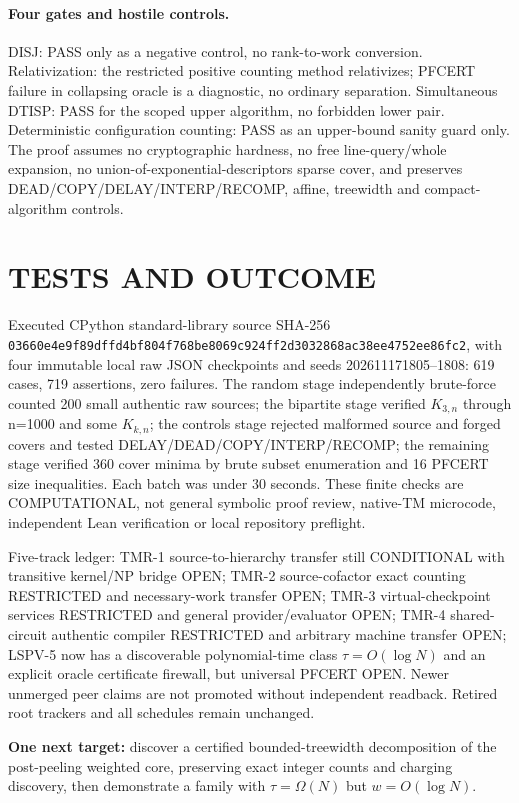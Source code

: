 \documentclass[11pt]{article}
\begin{document}
\paragraph{Four gates and hostile controls.}
DISJ: PASS only as a negative control, no rank-to-work conversion. Relativization: the restricted positive counting method relativizes; PFCERT failure in collapsing oracle is a diagnostic, no ordinary separation. Simultaneous DTISP: PASS for the scoped upper algorithm, no forbidden lower pair. Deterministic configuration counting: PASS as an upper-bound sanity guard only. The proof assumes no cryptographic hardness, no free line-query/whole expansion, no union-of-exponential-descriptors sparse cover, and preserves DEAD/COPY/DELAY/INTERP/RECOMP, affine, treewidth and compact-algorithm controls.

\section{TESTS AND OUTCOME}
Executed CPython standard-library source SHA-256 \texttt{03660e4e9f89dffd4bf804f768be8069c924ff2d3032868ac38ee4752ee86fc2}, with four immutable local raw JSON checkpoints and seeds 202611171805--1808: 619 cases, 719 assertions, zero failures. The random stage independently brute-force counted 200 small authentic raw sources; the bipartite stage verified $K_{3,n}$ through n=1000 and some $K_{k,n}$; the controls stage rejected malformed source and forged covers and tested DELAY/DEAD/COPY/INTERP/RECOMP; the remaining stage verified 360 cover minima by brute subset enumeration and 16 PFCERT size inequalities. Each batch was under 30 seconds. These finite checks are COMPUTATIONAL, not general symbolic proof review, native-TM microcode, independent Lean verification or local repository preflight.
\par Five-track ledger: TMR-1 source-to-hierarchy transfer still CONDITIONAL with transitive kernel/NP bridge OPEN; TMR-2 source-cofactor exact counting RESTRICTED and necessary-work transfer OPEN; TMR-3 virtual-checkpoint services RESTRICTED and general provider/evaluator OPEN; TMR-4 shared-circuit authentic compiler RESTRICTED and arbitrary machine transfer OPEN; LSPV-5 now has a discoverable polynomial-time class $\tau=O(\log N)$ and an explicit oracle certificate firewall, but universal PFCERT OPEN. Newer unmerged peer claims are not promoted without independent readback. Retired root trackers and all schedules remain unchanged.
\par\noindent\textbf{One next target:} discover a certified bounded-treewidth decomposition of the post-peeling weighted core, preserving exact integer counts and charging discovery, then demonstrate a family with $\tau=\Omega(N)$ but $w=O(\log N)$.
\end{document}
